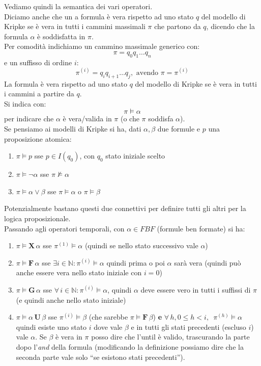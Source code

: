 \begin{definizione}
  Vediamo quindi la semantica dei vari operatori.\\
  Diciamo anche che un a formula è vera rispetto ad uno stato $q$ del modello di
  Kripke se è vera in tutti i cammini massimali $\pi$ che partono da $q$,
  dicendo che la formula $\alpha$ è soddisfatta in $\pi$.\\
  Per comodità indichiamo un cammino massimale generico con:
  \[\pi=q_0q_1\ldots q_n\]
  e un suffisso di ordine $i$:
  \[\pi^{(i)}=q_iq_{i+1}\ldots q_j,\mbox{ avendo }\pi=\pi^{(i)}\]
  La formula è vera rispetto ad uno stato $q$ del modello di Kripke se è vera in
  tutti i cammini a partire da $q$.\\
  Si indica con:
  \[\pi\vDash\alpha\]
  per indicare che $\alpha$ è vera/valida in $\pi$ (o che $\pi$ soddisfa
  $\alpha$).\\
  
  Se pensiamo ai modelli di Kripke si ha, dati $\alpha,\beta$ due formule e $p$
  una proposizione atomica:
  \begin{enumerate}
    \item $\pi\vDash p$ sse $p\in I(q_0)$, con $q_0$ stato iniziale scelto
    \item $\pi\vDash \neg \alpha$  sse $\pi\not\vDash \alpha$
    \item $\pi\vDash \alpha\lor\beta$ sse $\pi\vDash \alpha$ o $\pi\vDash \beta$
  \end{enumerate}
  Potenzialmente bastano questi due connettivi per definire tutti gli altri per
  la logica proposizionale. \\
  Passando agli operatori temporali, con $\alpha\in FBF$ (formule ben formate)
  si ha:
  \begin{enumerate}
    \item $\pi\vDash\mathbf{X}\,\alpha$ sse $\pi^{(1)}\vDash \alpha$ (quindi se
    nello stato successivo vale $\alpha$)
    \item $\pi\vDash\mathbf{F}\,\alpha$ sse $\exists
    i\in\mathbb{N}:\pi^{(i)}\vDash  \alpha$ quindi prima o poi $\alpha$ sarà
    vera (quindi può anche essere vera nello stato iniziale con $i=0$)
    \item $\pi\vDash\mathbf{G}\,\alpha$ sse $\forall\, i\in
    \mathbb{N}:\pi^{(i)}\vDash \alpha$, quindi $\alpha$ deve essere vero in
    tutti i suffissi di $\pi$ (e quindi anche nello stato iniziale)
    \item $\pi\vDash\alpha\,\mathbf{U}\,\beta$ sse $\pi^{(i)}\vDash \beta$ (che
    sarebbe $\pi\vDash\mathbf{F}\,\beta$) \textbf{e} $\forall\, h, 0\leq
    h<i,\,\,\, \pi^{(h)}\vDash \alpha$ quindi esiste uno stato $i$ dove vale
    $\beta$ e in tutti gli stati precedenti (escluso $i$) vale $\alpha$. Se
    $\beta$ è vera in $\pi$ posso dire che l'until è valido, trascurando la
    parte dopo l'\textit{and} della formula (modificando la definizione possiamo
    dire che la seconda parte vale solo ``se esistono stati precedenti'').
  \end{enumerate}
\end{definizione}
